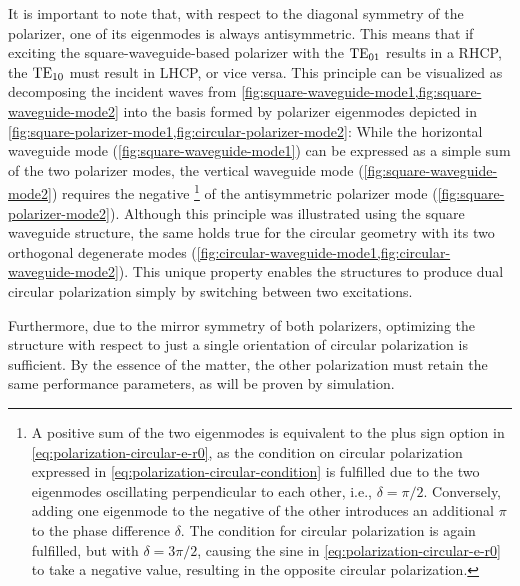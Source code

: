 \documentclass[11pt,a4paper,twoside,openany]{report}
\begin{document}
\begin{remark}
    \label{remark:dual-polarization-capatibility}
    It is important to note that, with respect to the diagonal symmetry of the polarizer, one of its eigenmodes is always antisymmetric. This means that if exciting the square-waveguide-based polarizer with the $\text{TE}_{01}$ results in a RHCP, the $\text{TE}_{10}$ must result in LHCP, or vice versa. This principle can be visualized as decomposing the incident waves from \cref{fig:square-waveguide-mode1,fig:square-waveguide-mode2} into the basis formed by polarizer eigenmodes depicted in \cref{fig:square-polarizer-mode1,fig:circular-polarizer-mode2}: While the horizontal waveguide mode (\cref{fig:square-waveguide-mode1}) can be expressed as a simple sum of the two polarizer modes, the vertical waveguide mode (\cref{fig:square-waveguide-mode2}) requires the negative%
        \footnote{A positive sum of the two eigenmodes is equivalent to the plus sign option in \cref{eq:polarization-circular-e-r0}, as the condition on circular polarization expressed in \cref{eq:polarization-circular-condition} is fulfilled due to the two eigenmodes oscillating perpendicular to each other, i.e., $\delta = \pi/2$. Conversely, adding one eigenmode to the negative of the other introduces an additional $\pi$ to the phase difference $\delta$. The condition for circular polarization is again fulfilled, but with $\delta = 3\pi/2$, causing the sine in \cref{eq:polarization-circular-e-r0} to take a negative value, resulting in the opposite circular polarization.}
    of the antisymmetric polarizer mode (\cref{fig:square-polarizer-mode2}). Although this principle was illustrated using the square waveguide structure, the same holds true for the circular geometry with its two orthogonal degenerate modes (\cref{fig:circular-waveguide-mode1,fig:circular-waveguide-mode2}). This unique property enables the structures to produce dual circular polarization simply by switching between two excitations.

    Furthermore, due to the mirror symmetry of both polarizers, optimizing the structure with respect to just a single orientation of circular polarization is sufficient. By the essence of the matter, the other polarization must retain the same performance parameters, as will be proven by simulation.
\end{remark}
\end{document}

